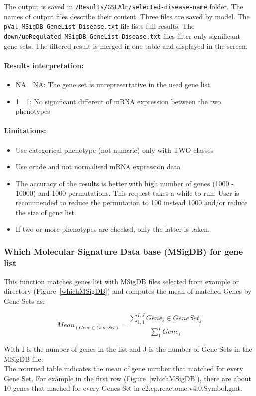 \documentclass[a4paper]{article}
\begin{document}
The output is saved in \texttt{/Results/GSEAlm/selected-disease-name} folder. The names of output files describe their content.  Three files are saved by model. The \texttt{pVal\_MSigDB\_GeneList\_Disease.txt} file lists full results. The \texttt{down/upRegulated\_MSigDB\_GeneList\_Disease.txt} files filter only significant gene sets. The filtered result is merged in one table and  displayed in the screen.

\paragraph{Results interpretation:}
\begin{itemize}
\item NA~~NA: The gene set is unrepresentative in the used gene list
\item 1~~1: No significant different of mRNA expression between the two phenotypes
\end{itemize}

\paragraph{Limitations:}
\begin{itemize}
\item Use categorical phenotype (not numeric) only with TWO classes
\item Use crude and not normalised mRNA expression data
\item The accuracy of the results is better with high number of genes (1000 - 10000) and 1000 permutations. This request takes a while to run. User is recommended to reduce the permutation to 100 instead 1000 and/or reduce the size of gene list.  
\item If two or more phenotypes are checked, only the latter is taken.
\end{itemize}

\subsubsection{Which Molecular Signature Data base (MSigDB) for gene list}
    This function matches genes list with MSigDB files selected from example or directory (Figure~\ref{whichMSigDB}) and computes the mean of matched Genes by Gene Sets as:   


$$  Mean_{(Gene\in GeneSet)} = \frac{ \sum_{1,1}^{I,J} Gene_i \in GeneSet_j}{\sum_{1}^{I} Gene_i} $$

With I is the number of genes in the list and J is the number of Gene Sets in the MSigDB file. \\
The returned table indicates the mean of gene number that matched for every Gene Set. For example in the first row (Figure~\ref{whichMSigDB}), there are about 10 genes that mached for every Genes Set in c2.cp.reactome.v4.0.Symbol.gmt.
\end{document}
